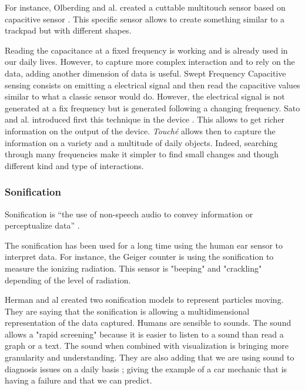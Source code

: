 For instance, Olberding and al. created a cuttable multitouch sensor based on capacitive sensor \cite{olberdingCuttableMultitouchSensor2013}.
This specific sensor allows to create something similar to a trackpad but with different shapes.

Reading the capacitance at a fixed frequency is working and is already used in our daily lives. 
However, to capture more complex interaction and to rely on the data, adding another dimension of data is useful.
Swept Frequency Capacitive sensing consists on emitting a electrical signal and then read the capacitive values
similar to what a classic sensor would do. However, the electrical signal is not generated at a fix frequency
but is generated following a changing frequency. 
Sato and al. introduced first this technique in the  device \cite{satoToucheEnhancingTouch2012}.
This allows to get richer information on the output of the device. \textit{Touché} allows then to capture 
the information on a variety and a multitude of daily objects.
Indeed, searching through many frequencies make it simpler to find small changes and though different kind and type 
of interactions.

\subsubsection{Sonification}

Sonification is “the use of non-speech audio to convey information or perceptualize data” \cite{hermannListenYourData}.

The sonification has been used for a long time using the human ear sensor to interpret data. For instance, the Geiger 
counter is using the sonification to measure the ionizing radiation. This sensor is "beeping" and "crackling"
depending of the level of radiation.

Herman and al \cite{hermannListenYourData} created two sonification models to represent particles moving. They are 
saying that the sonification is allowing a multidimensional representation of the data captured.
Humans are sensible to sounds. The sound allows a "rapid screening" because it is easier to listen to a sound than
read a graph or a text. The sound when combined with visualization is bringing more granularity and understanding.
They are also adding that we are using sound to diagnosis issues on a daily basis ; giving the example of a car
mechanic that is having a failure and that we can predict.

